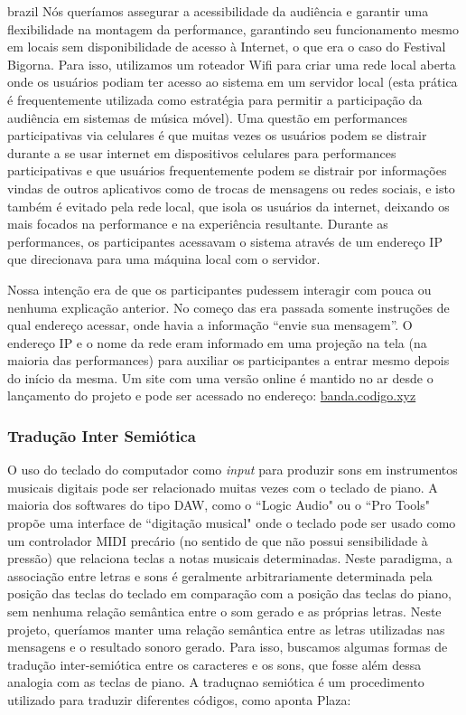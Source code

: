 \begin{otherlanguage*}{brazil}
Nós queríamos assegurar a acessibilidade da audiência e garantir uma flexibilidade na montagem da performance, garantindo seu funcionamento mesmo em locais sem disponibilidade de acesso à Internet, o que era o caso do Festival Bigorna. Para isso, utilizamos um roteador Wifi para criar uma rede local aberta onde os usuários podiam ter acesso ao sistema em um servidor local (esta prática é frequentemente utilizada como estratégia para permitir a participação da audiência em sistemas de música móvel\cite{Lambert:2016}). Uma questão em performances participativas via celulares é que muitas vezes os usuários podem se distrair durante a se usar internet em dispositivos celulares para performances participativas e que usuários frequentemente podem se distrair por informações vindas de outros aplicativos como de trocas de mensagens ou redes sociais\cite{wu2017open}, e isto também é evitado pela rede local, que isola os usuários da internet, deixando os mais focados na performance e na experiência resultante. Durante as performances, os participantes acessavam o sistema através de um endereço IP que direcionava para uma máquina local com o servidor.

Nossa intenção era de que os participantes pudessem interagir com pouca ou nenhuma explicação anterior. No começo das era passada somente instruções de qual endereço acessar, onde havia a informação ``envie sua mensagem''. O endereço IP e o nome da rede eram informado em uma projeção na tela (na maioria das performances) para auxiliar os participantes a entrar mesmo depois do início da mesma. Um site com uma versão online é mantido no ar desde o lançamento do projeto e pode ser acessado no endereço: \url{banda.codigo.xyz}




\subsubsection{Tradução Inter Semiótica}
\label{sec:trad}

O uso do teclado do computador como \emph{input} para produzir sons em instrumentos musicais digitais pode ser relacionado muitas vezes com o teclado de piano. A maioria dos softwares do tipo DAW, como o ``Logic Audio" ou o ``Pro Tools" propõe uma interface de ``digitação musical" onde o teclado pode ser usado como um controlador MIDI precário (no sentido de que não possui sensibilidade à pressão) que relaciona teclas a notas musicais determinadas. Neste paradigma, a associação entre letras e sons é geralmente arbitrariamente determinada pela posição das teclas do teclado em comparação com a posição das teclas do piano, sem nenhuma relação semântica entre o som gerado e as próprias letras. Neste projeto, queríamos manter uma relação semântica entre as letras utilizadas nas mensagens e o resultado sonoro gerado. Para isso, buscamos algumas formas de tradução inter-semiótica entre os caracteres e os sons, que fosse além dessa analogia com as teclas de piano. A traduçnao semiótica é um procedimento utilizado para traduzir diferentes códigos, como aponta Plaza: 


\end{otherlanguage*}
